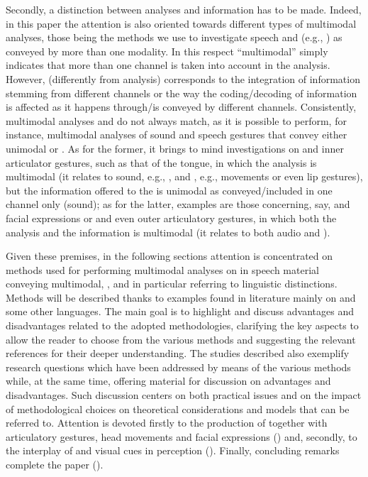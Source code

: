 \documentclass[output=paper]{langsci/langscibook}
\begin{document}
Secondly, a distinction between analyses and information has to be made. Indeed, in this paper the attention is also oriented towards different types of multimodal analyses, those being the methods we use to investigate speech and  (e.g., ) as conveyed by more than one modality. In this respect ``multimodal'' simply indicates that more than one channel is taken into account in the analysis. However,  (differently from analysis) corresponds to the integration of information stemming from different channels or the way the coding\slash decoding of information is affected as it happens through\slash is conveyed by different channels. Consistently, multimodal analyses and  do not always match, as it is possible to perform, for instance, multimodal analyses of sound and speech gestures that convey either unimodal or . As for the former, it brings to mind investigations on  and inner articulator gestures, such as that of the tongue, in which the analysis is multimodal (it relates to sound, e.g., , and , e.g.,  movements or even lip gestures), but the information offered to the  is unimodal as conveyed\slash included in one channel only (sound); as for the latter, examples are those concerning, say,  and facial expressions or  and even outer articulatory gestures, in which both the analysis and the information is multimodal (it relates to both audio and ).

Given these premises, in the following sections attention is concentrated on methods used for performing multimodal analyses on  in speech material conveying multimodal, , and in particular referring to linguistic distinctions. Methods will be described thanks to examples found in literature mainly on  and some other  languages. The main goal is to highlight and discuss advantages and disadvantages related to the adopted methodologies, clarifying the key aspects to allow the reader to choose from the various methods and suggesting the relevant references for their deeper understanding. The studies described also exemplify research questions which have been addressed by means of the various methods while, at the same time, offering material for discussion on advantages and disadvantages. Such discussion centers on both practical issues and on the impact of methodological choices on theoretical considerations and models that can be referred to. Attention is devoted firstly to the production of  together with articulatory gestures, head movements and facial expressions () and, secondly, to the interplay of  and visual cues in perception (). Finally, concluding remarks complete the paper ().
\end{document}
